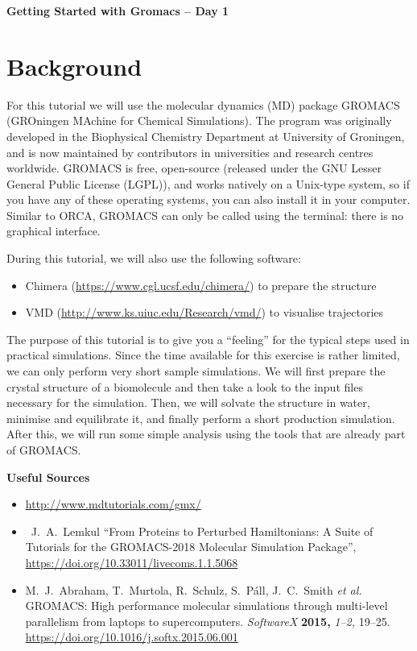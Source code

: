 \documentclass[10pt]{article}
\begin{document}
\textbf{\LARGE Getting Started with Gromacs -- Day 1}

\section{Background}
For this tutorial we will use the molecular dynamics (MD) package GROMACS (GROningen MAchine for Chemical Simulations). The program was originally developed in the Biophysical Chemistry Department at University of Groningen, and is now maintained by contributors in universities and research centres worldwide. GROMACS is free, open-source (released under the GNU Lesser General Public License (LGPL)), and works natively on a Unix-type system, so if you have any of these operating systems, you can also install it in your computer. Similar to ORCA, GROMACS can only be called using the terminal: there is no graphical interface.

During this tutorial, we will also use the following software:

\begin{itemize}
	 \item Chimera (\url{https://www.cgl.ucsf.edu/chimera/}) to prepare the structure 
	\item VMD (\url{http://www.ks.uiuc.edu/Research/vmd/}) to visualise trajectories
\end{itemize}

The purpose of this tutorial is to give you a ``feeling'' for the typical steps used in practical simulations. Since the time available for this exercise is rather limited, we can only perform very short sample simulations. We will first prepare the crystal structure of a biomolecule and then take a look to the input files necessary for the simulation. Then, we will solvate the structure in water, minimise and equilibrate it, and finally perform a short production simulation. After this, we will run some simple analysis using the tools that are already part of GROMACS.

\textbf{Useful Sources}
\begin{itemize}
	 \item \url{http://www.mdtutorials.com/gmx/}
	\item\ J.\ A.\ Lemkul ``From Proteins to Perturbed Hamiltonians: A Suite of Tutorials for the GROMACS-2018 Molecular Simulation Package'', \url{https://doi.org/10.33011/livecoms.1.1.5068}
    \item M.\ J.\ Abraham, T.\ Murtola, R.\ Schulz, S.\ P\'{a}ll, J.\ C.\ Smith \textit{et al.} GROMACS: High performance molecular simulations through multi-level parallelism from laptops to supercomputers. \textit{SoftwareX} \textbf{2015,} \textit{1--2,} 19--25. \url{https://doi.org/10.1016/j.softx.2015.06.001} 
\end{itemize}
\end{document}
